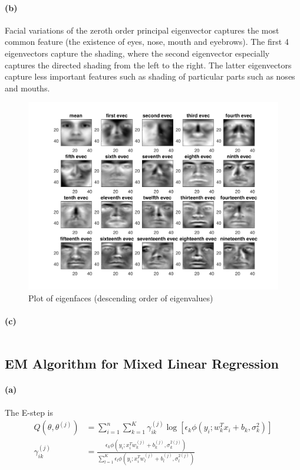 \documentclass[12pt]{article}
\begin{document}
\paragraph{(b)}
Facial variations of the zeroth order principal eigenvector captures the most common feature (the existence of eyes, nose, mouth and eyebrows).
The first 4 eigenvectors capture the shading, where the second eigenvector especially captures the directed shading from the left to the right.
The latter eigenvectors capture less important features such as shading of particular parts such as noses and mouths.
\begin{figure}[htbp]
    \centering
    \includegraphics[width=\textwidth]{./hw5/problem2/hw5p2b.pdf}
    \caption{Plot of eigenfaces (descending order of eigenvalues)}
\end{figure}

\paragraph{(c)}
\inputminted[frame=single,framesep=10pt,linenos,xleftmargin=\parindent]{octave}{./hw5/problem2/eigenface.m}

\subsection{EM Algorithm for Mixed Linear Regression}
\paragraph{(a)}
The E-step is
\begin{align*}
    Q(\theta,\theta^{(j)})&=\sum_{i=1}^{n}\sum_{k=1}^{K}\gamma_{ik}^{(j)}\log\left[\epsilon_k\phi\left(y_i;w_k^T x_i+b_k,\sigma_k^{2}\right)\right]\\
    \gamma_{ik}^{(j)}&=\frac{\epsilon_k\phi\left(y_i;x_i^T w_k^{(j)}+b_k^{(j)},\sigma_k^{2(j)}\right)}{\sum_{l=1}^{K}\epsilon_l\phi\left(y_i;x_i^T w_l^{(j)}+b_l^{(j)},\sigma_l^{2(j)}\right)}
\end{align*}
\end{document}

